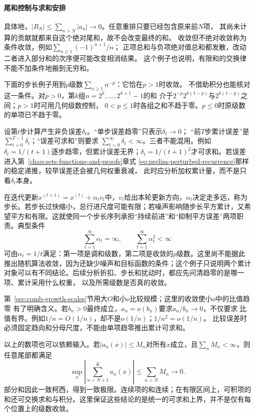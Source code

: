 \paragraph{尾和控制与求和安排}

具体地，$|R_N|\leq\sum_{n>N}|a_n|\to0$。任意重排只要已经包含原来前$N$项，
其尚未计算的贡献就都来自这个绝对尾和，故不会改变最终的和。
收敛但不绝对收敛称为条件收敛，例如$\sum_{n\geq1}(-1)^{n+1}/n$；
正项总和与负项绝对值总和都发散，改动二者进入部分和的次序便可能改变相消结果。
这个例子也说明，有限和的交换律不能不加条件地搬到无穷和。

下面的步长例子用到$p$级数$\sum_{n\geq1}n^{-p}$：它恰在$p>1$时收敛。
不借助积分也能核对这一条件。对$p>0$，第$k$组$n=2^k,\ldots,2^{k+1}-1$的和
介于$2^{-p}2^{k(1-p)}$与$2^{k(1-p)}$之间；$p>1$时可用几何级数控制，
$0<p\leq1$时各组之和不趋于零。$p\leq0$时原级数的单项已不趋于零。

设第$t$步计算产生非负误差$\delta_t$。“单步误差趋零”只表示$\delta_t\to0$； “前$T$步累计误差”是$\sum_{t=0}^{T-1}\delta_t$；“误差可求和”则要求 $\sum_{t=0}^{\infty}\delta_t<\infty$。三者不能混用。例如 $\delta_t=1/(t+1)$逐步趋零，但累计误差无界；$\delta_t=1/(t+1)^2$才可求和。若误差进入第~\ref{chap:sets-functions-and-proofs}章式
\eqref{eq:prelim-perturbed-recurrence}那样的稳定递推，较早误差还会被几何权重衰减， 此时应分析加权累计量，而不是只看$\delta_t$本身。

在迭代更新$x^{(t+1)}=x^{(t)}+\alpha_t v_t$中，$v_t$给出本轮更新方向，$\alpha_t$决定走多远，称为步长。若步长过快缩小，总行进尺度可能有限；若噪声影响随步长平方累计，又希望平方和有限。这就使同一个步长序列承担“持续前进”和“抑制平方误差”两项职责。典型条件
\[   \sum_{t=1}^{\infty}\alpha_t=\infty,   \qquad   \sum_{t=1}^{\infty}\alpha_t^2<\infty \]
可由$\alpha_t=1/t$满足：第一项是调和级数，第二项是收敛的$p$级数。这里尚不能据此推出随机算法收敛，因为还缺少噪声和目标函数的条件；这个例子只说明两个累计对象可以有不同结论。后续分析折扣、步长和扰动时，都应先问清趋零的是哪一项、累计采用什么权重， 以及所需级数是否真的收敛。


第~\ref{sec:comb-growth-scales}节用大$O$和小$o$比较规模；这里的收敛使小$o$中的比值趋零
有了明确含义。若$b_n>0$最终成立，$a_n=o(b_n)$要求$a_n/b_n\to0$，不仅要求
比值有界。例如$1/n=O(1/n)$，却不是$o(1/n)$；$1/n^2=o(1/n)$。
比较误差时必须固定趋向和分母尺度，不能由单项趋零推出累计可求和。

以上的数项也可以依赖输入。若$|a_n(x)|\leq M_n$对所有$x$成立，且$\sum_nM_n<\infty$，则任意尾部都满足
\[
 \sup_x\left|\sum_{n=N+1}^{K}a_n(x)\right|\leq\sum_{n>N}M_n\longrightarrow0.
\]
部分和因此一致柯西，得到一致极限。连续项的和连续；在有限区间上，可积项的和还可交换求和与积分。这里保证这些结论的是统一的可求和上界，并不是仅有每个位置上的级数收敛。

